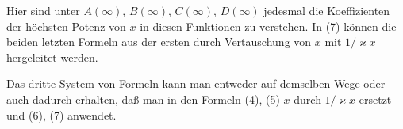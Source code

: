 Hier sind unter $A(\infty)$, $B(\infty)$, $C(\infty)$, $D(\infty)$ jedesmal die
Koeffizienten der höchsten Potenz von $x$ in diesen Funktionen zu verstehen. In
(7) können die beiden letzten Formeln aus der ersten durch Vertauschung von $x$
mit $1/\varkappa x$ hergeleitet werden.

Das dritte System von Formeln kann man entweder auf demselben Wege oder
auch dadurch erhalten, daß man in den Formeln (4), (5) $x$ durch $1/\varkappa x$
ersetzt und (6), (7) anwendet.
